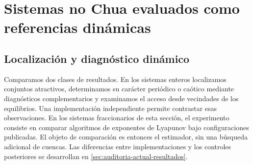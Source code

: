 \section{Sistemas no Chua evaluados como referencias dinámicas}
\label{sec:nonchua-dynamic-benchmarks}

\subsection{Localización y diagnóstico dinámico}

Comparamos dos clases de resultados. En los sistemas enteros localizamos
conjuntos atractivos, determinamos su carácter periódico o caótico mediante
diagnósticos complementarios y examinamos el acceso desde vecindades de los
equilibrios. Una implementación independiente permite contrastar esas
observaciones. En los sistemas fraccionarios de esta sección, el experimento
consiste en comparar algoritmos de exponentes de Lyapunov bajo configuraciones
publicadas. El objeto de comparación es entonces el estimador, sin una
búsqueda adicional de cuencas. Las diferencias entre implementaciones y los
controles posteriores se desarrollan en
\cref{sec:auditoria-actual-resultados}.

